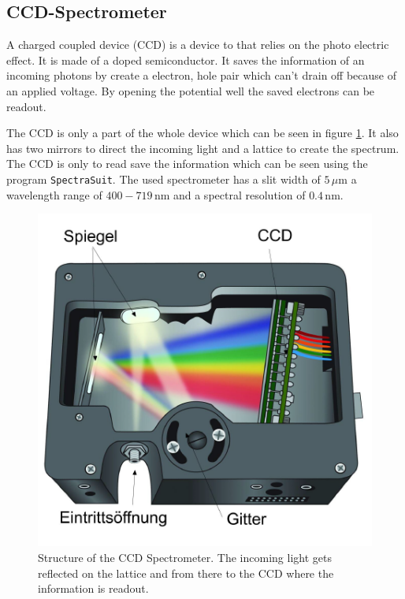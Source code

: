 \subsection{CCD-Spectrometer}
A charged coupled device (CCD) is a device to that relies on the photo electric effect. It is made of a doped semiconductor. It saves the information of an incoming photons by create a electron, hole pair which can't drain off because of an applied voltage. By opening the potential well the saved electrons can be readout.\par
The CCD is only a part of the whole device which can be seen in figure \ref{figCCD}. It also has two mirrors to direct the incoming light and a lattice to create the spectrum. The CCD is only to read save the information which can be seen using the program \verb|SpectraSuit|. The used spectrometer has a slit width of $5\,\mu$m a wavelength range of $400-719\,$nm and a spectral resolution of $0.4\,$nm.
\begin{figure}[ht]
	\includegraphics[scale=0.6]{Bild/CCD}
	\centering
	\caption[CCD-Spectrometer]{Structure of the CCD Spectrometer. The incoming light gets reflected on the lattice and from there to the CCD where the information is readout.\cite{Anleitung}}
	\label{figCCD}
\end{figure}
\FloatBarrier

